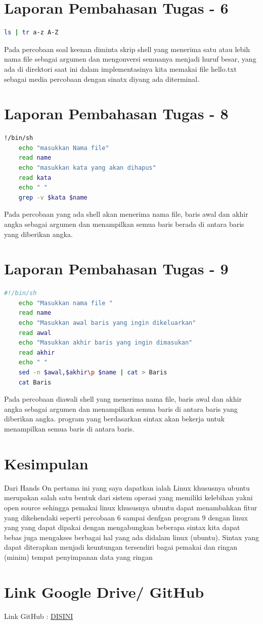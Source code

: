 \documentclass[11pt,a4paper]{article}
\begin{document}
\section{Laporan Pembahasan Tugas - 6}
    \begin{lstlisting}[language=Bash, caption=Program Assignment 6,label={labelkode}]
    ls | tr a-z A-Z
    \end{lstlisting}
    Pada percobaan soal keenan diminta skrip shell yang menerima satu atau lebih nama file sebagai argumen dan mengonversi semuanya menjadi huruf besar, 
    yang ada di direktori saat ini dalam implementasinya kita memakai file hello.txt sebagai media percobaan dengan sinatx diyang ada diterminal.

\section{Laporan Pembahasan Tugas - 8}
    \begin{lstlisting}[language=Bash, caption=Program Assignment 8,label={labelkode}]
    !/bin/sh
    echo "masukkan Nama file"
    read name
    echo "masukkan kata yang akan dihapus"
    read kata
    echo " "
    grep -v $kata $name
    \end{lstlisting}
    Pada percobaan yang ada shell akan  menerima nama file, baris awal dan akhir
    angka sebagai argumen dan menampilkan semua baris berada di antara baris yang diberikan
    angka.

\section{Laporan Pembahasan Tugas - 9}
    \begin{lstlisting}[language=Bash, caption=Program Assignment 9,label={labelkode}]
    #!/bin/sh
    echo "Masukkan nama file "
    read name
    echo "Masukkan awal baris yang ingin dikeluarkan"
    read awal
    echo "Masukkan akhir baris yang ingin dimasukan"
    read akhir
    echo " "
    sed -n $awal,$akhir\p $name | cat > Baris 
    cat Baris
    \end{lstlisting}
    Pada percobaan diawali shell yang menerima nama file, baris awal dan akhir
angka sebagai argumen dan menampilkan semua baris di antara baris yang diberikan
angka. program yang berdasarkan sintax akan bekerja untuk menampilkan semua baris di antara baris.

\section{Kesimpulan}
Dari Hands On pertama ini yang saya dapatkan ialah Linux khususnya ubuntu merupakan salah satu bentuk dari sistem operasi yang memiliki 
kelebihan yakni open source sehingga pemakai linux khususnya ubuntu dapat menambahkan fitur yang dikehendaki seperti percobaan 6 sampai denfgan program 9 dengan linux yang yang dapat dipakai dengan mengabungkan beberapa sintax kita dapat bebas juga mengakses berbagai hal yang ada didalam linux (ubuntu). 
Sintax yang dapat diterapkan menjadi keuntungan tersendiri bagai pemakai dan ringan (minim) tempat penyimpanan data yang ringan

\section{Link Google Drive/ GitHub}
Link GitHub : \href{https://github.com/Hans299}{DISINI}

\end{document}
